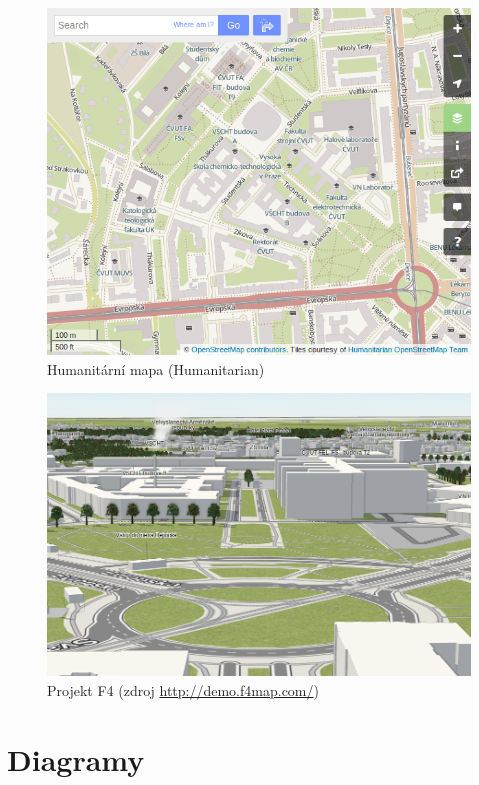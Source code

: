 \begin{figure}[H]
    \centering
    \includegraphics[width=11.5cm]{pictures/osm_humanitarian.png} 
    \caption{Humanitární mapa (Humanitarian)}
    \label{fig:humanitarian}
\end{figure}

\begin{figure}[H]
    \centering
    \includegraphics[width=11.5cm]{pictures/F4.png} 
    \caption{Projekt F4 (zdroj \url{http://demo.f4map.com/})}
    \label{fig:F4}
\end{figure}


\chapter{Diagramy}
\label{digramy}

